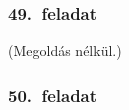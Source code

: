 \subsubsection*{49.~feladat}
(Megoldás nélkül.)
\subsubsection*{50.~feladat}
\begin{program}

\end{program}
